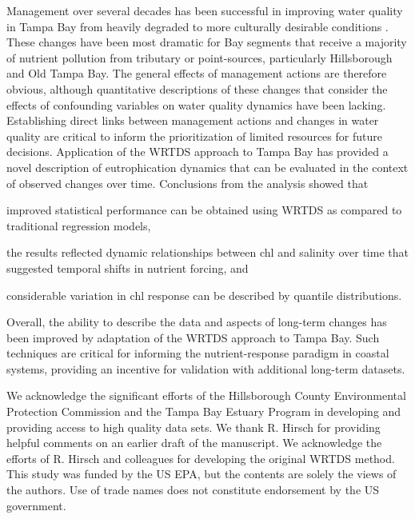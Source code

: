 \documentclass{svjour3}\usepackage[]{graphicx}\usepackage[]{color}
\begin{document}
Management over several decades has been successful in improving water quality in Tampa Bay from heavily degraded to more culturally desirable conditions \cite{Greening06}.  These changes have been most dramatic for Bay segments that receive a majority of nutrient pollution from tributary or point-sources, particularly Hillsborough and Old Tampa Bay.  The general effects of management actions are therefore obvious, although quantitative descriptions of these changes that consider the effects of confounding variables on water quality dynamics have been lacking.  Establishing direct links between management actions and changes in water quality are critical to inform the prioritization of limited resources for future decisions.  Application of the \ac{WRTDS} approach to Tampa Bay has provided a novel description of eutrophication dynamics that can be evaluated in the context of observed changes over time.  Conclusions from the analysis showed that\begin{inparaenum}[1\upshape)]
\item improved statistical performance can be obtained using \ac{WRTDS} as compared to traditional regression models,
\item the results reflected dynamic relationships between \ac{chl} and salinity over time that suggested temporal shifts in nutrient forcing, and 
\item considerable variation in \ac{chl} response can be described by quantile distributions.
\end{inparaenum}
Overall, the ability to describe the data and aspects of long-term changes has been improved by adaptation of the \ac{WRTDS} approach to Tampa Bay. Such techniques are critical for informing the nutrient-response paradigm in coastal systems, providing an incentive for validation with additional long-term datasets.

\begin{acknowledgements}
We acknowledge the significant efforts of the Hillsborough County Environmental Protection Commission and the Tampa Bay Estuary Program in developing and providing access to high quality data sets.  We thank R. Hirsch for providing helpful comments on an earlier draft of the manuscript.  We acknowledge the efforts of R. Hirsch and colleagues for developing the original \ac{WRTDS} method. This study was funded by the US \acl{EPA}, but the contents are solely the views of the authors.  Use of trade names does not constitute endorsement by the US government.
\end{acknowledgements}
\end{document}
